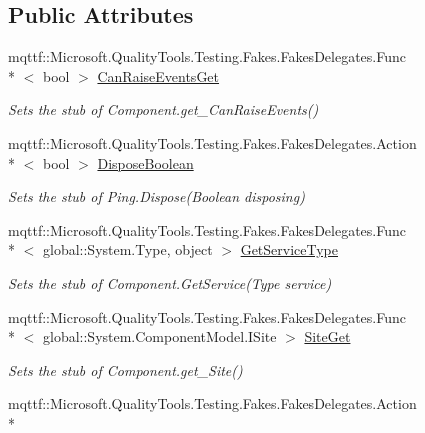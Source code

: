 \subsection*{Public Attributes}
\begin{DoxyCompactItemize}
\item 
mqttf\-::\-Microsoft.\-Quality\-Tools.\-Testing.\-Fakes.\-Fakes\-Delegates.\-Func\\*
$<$ bool $>$ \hyperlink{class_system_1_1_net_1_1_network_information_1_1_fakes_1_1_stub_ping_a3a63dca34d30d55662d038c8092511b5}{Can\-Raise\-Events\-Get}
\begin{DoxyCompactList}\small\item\em Sets the stub of Component.\-get\-\_\-\-Can\-Raise\-Events()\end{DoxyCompactList}\item 
mqttf\-::\-Microsoft.\-Quality\-Tools.\-Testing.\-Fakes.\-Fakes\-Delegates.\-Action\\*
$<$ bool $>$ \hyperlink{class_system_1_1_net_1_1_network_information_1_1_fakes_1_1_stub_ping_a4a0a62c9731c5654501769557f268909}{Dispose\-Boolean}
\begin{DoxyCompactList}\small\item\em Sets the stub of Ping.\-Dispose(\-Boolean disposing)\end{DoxyCompactList}\item 
mqttf\-::\-Microsoft.\-Quality\-Tools.\-Testing.\-Fakes.\-Fakes\-Delegates.\-Func\\*
$<$ global\-::\-System.\-Type, object $>$ \hyperlink{class_system_1_1_net_1_1_network_information_1_1_fakes_1_1_stub_ping_a52e6a202c82b6c1d118992d852f265b5}{Get\-Service\-Type}
\begin{DoxyCompactList}\small\item\em Sets the stub of Component.\-Get\-Service(\-Type service)\end{DoxyCompactList}\item 
mqttf\-::\-Microsoft.\-Quality\-Tools.\-Testing.\-Fakes.\-Fakes\-Delegates.\-Func\\*
$<$ global\-::\-System.\-Component\-Model.\-I\-Site $>$ \hyperlink{class_system_1_1_net_1_1_network_information_1_1_fakes_1_1_stub_ping_a75fd80139a9561f70745e8f942fae06d}{Site\-Get}
\begin{DoxyCompactList}\small\item\em Sets the stub of Component.\-get\-\_\-\-Site()\end{DoxyCompactList}\item 
mqttf\-::\-Microsoft.\-Quality\-Tools.\-Testing.\-Fakes.\-Fakes\-Delegates.\-Action\\*

\end{DoxyCompactItemize}

